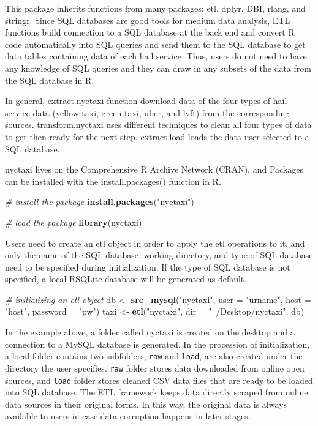\documentclass[12pt,twoside]{reedthesis}
\newenvironment{Shaded}{\begin{snugshade}}{\end{snugshade}}
\newcommand{\KeywordTok}[1]{\textcolor[rgb]{0.13,0.29,0.53}{\textbf{#1}}}
\newcommand{\DataTypeTok}[1]{\textcolor[rgb]{0.13,0.29,0.53}{#1}}
\newcommand{\StringTok}[1]{\textcolor[rgb]{0.31,0.60,0.02}{#1}}
\newcommand{\CommentTok}[1]{\textcolor[rgb]{0.56,0.35,0.01}{\textit{#1}}}
\newcommand{\NormalTok}[1]{#1}
\theoremstyle{definition}
\theoremstyle{definition}
\theoremstyle{definition}
\theoremstyle{remark}
\begin{document}
This package inherits functions from many packages: etl, dplyr, DBI,
rlang, and stringr. Since SQL databases are good tools for medium data
analysis, ETL functions build connection to a SQL database at the back
end and convert R code automatically into SQL queries and send them to
the SQL database to get data tables containing data of each hail
service. Thus, users do not need to have any knowledge of SQL queries
and they can draw in any subsets of the data from the SQL database in R.

In general, extract.nyctaxi function download data of the four types of
hail service data (yellow taxi, green taxi, uber, and lyft) from the
corresponding sources. transform.nyctaxi uses different techniques to
clean all four types of data to get then ready for the next step.
extract.load loads the data user selected to a SQL database.

nyctaxi lives on the Comprehensive R Archive Network (CRAN), and
Packages can be installed with the install.packages() function in R.
\begin{Shaded}
\begin{Highlighting}[]
\CommentTok{# install the package}
\KeywordTok{install.packages}\NormalTok{(}\StringTok{"nyctaxi"}\NormalTok{)}

\CommentTok{# load the package}
\KeywordTok{library}\NormalTok{(nyctaxi)}
\end{Highlighting}
\end{Shaded}
Users need to create an etl object in order to apply the etl operations
to it, and only the name of the SQL database, working directory, and
type of SQL database need to be specified during initialization. If the
type of SQL database is not specified, a local RSQLite database will be
generated as default.
\begin{Shaded}
\begin{Highlighting}[]
\CommentTok{# initializing an etl object}
\NormalTok{db <-}\StringTok{ }\KeywordTok{src_mysql}\NormalTok{(}\StringTok{"nyctaxi"}\NormalTok{, }\DataTypeTok{user =} \StringTok{"urname"}\NormalTok{, }\DataTypeTok{host =} \StringTok{"host"}\NormalTok{, }
    \DataTypeTok{password =} \StringTok{"pw"}\NormalTok{)}
\NormalTok{taxi <-}\StringTok{ }\KeywordTok{etl}\NormalTok{(}\StringTok{"nyctaxi"}\NormalTok{, }\DataTypeTok{dir =} \StringTok{"~/Desktop/nyctaxi"}\NormalTok{, db)}
\end{Highlighting}
\end{Shaded}
In the example above, a folder called nyctaxi is created on the desktop
and a connection to a MySQL database is generated. In the procession of
initialization, a local folder contains two subfolders, \texttt{raw} and
\texttt{load}, are also created under the directory the user specifies.
\texttt{raw} folder stores data downloaded from online open sources, and
\texttt{load} folder stores cleaned CSV data files that are ready to be
loaded into SQL database. The ETL framework keeps data directly scraped
from online data sources in their original forms. In this way, the
original data is always available to users in case data corruption
happens in later stages.
\end{document}
